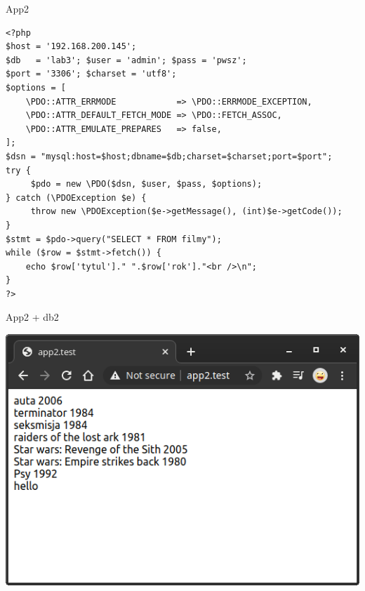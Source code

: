 \documentclass[presentation]{beamer}
\begin{document}
\begin{frame}[label={sec:org1e01d7b},fragile]{App2}
 \TINY
\begin{verbatim}
<?php
$host = '192.168.200.145';
$db   = 'lab3'; $user = 'admin'; $pass = 'pwsz';
$port = '3306'; $charset = 'utf8';
$options = [
    \PDO::ATTR_ERRMODE            => \PDO::ERRMODE_EXCEPTION,
    \PDO::ATTR_DEFAULT_FETCH_MODE => \PDO::FETCH_ASSOC,
    \PDO::ATTR_EMULATE_PREPARES   => false,
];
$dsn = "mysql:host=$host;dbname=$db;charset=$charset;port=$port";
try {
     $pdo = new \PDO($dsn, $user, $pass, $options);
} catch (\PDOException $e) {
     throw new \PDOException($e->getMessage(), (int)$e->getCode());
}
$stmt = $pdo->query("SELECT * FROM filmy");
while ($row = $stmt->fetch()) {
    echo $row['tytul']." ".$row['rok']."<br />\n";
}
?>
\end{verbatim}
\end{frame}
\begin{frame}[label={sec:org32355de}]{App2 + db2}
\begin{center}
\includegraphics[width=.9\linewidth]{./data/app/app2.png}
\end{center}
\end{frame}
\end{document}
